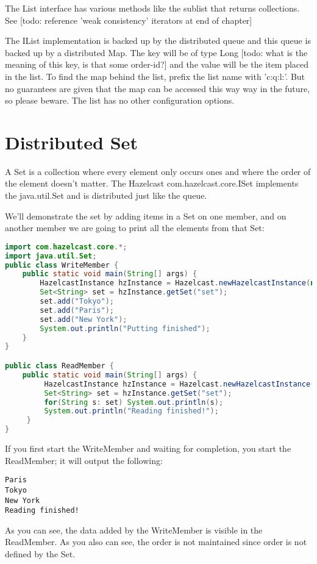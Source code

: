 The List interface has various methods like the sublist that returns collections. See [todo: reference 'weak consistency' iterators at end of chapter]

The IList implementation is backed up by the distributed queue and this queue is backed up by a distributed Map. The key will be of type Long [todo: what is the meaning of this key, is that some order-id?] and the value will be the item placed in the list. To find the map behind the list, prefix the list name with 'c:q:l:'. But no guarantees are given that the map can be accessed this way way in the future, so please beware. The list has no other configuration options.

\section{Distributed Set}
A Set is a collection where every element only occurs ones and where the order of the element doesn't matter. The Hazelcast com.hazelcast.core.ISet implements the java.util.Set and is distributed just like the queue.

We'll demonstrate the set by adding items in a Set on one member, and on another member we are going to print all the elements from that Set:
\begin{lstlisting}[language=java]
import com.hazelcast.core.*;
import java.util.Set;
public class WriteMember {
    public static void main(String[] args) {
        HazelcastInstance hzInstance = Hazelcast.newHazelcastInstance(null);
        Set<String> set = hzInstance.getSet("set");
        set.add("Tokyo");
        set.add("Paris");
        set.add("New York");
        System.out.println("Putting finished");
    }
}

public class ReadMember {
    public static void main(String[] args) {
         HazelcastInstance hzInstance = Hazelcast.newHazelcastInstance(null);
         Set<String> set = hzInstance.getSet("set");
         for(String s: set) System.out.println(s);
         System.out.println("Reading finished!");
     }
}
\end{lstlisting}
If you first start the WriteMember and waiting for completion, you start the ReadMember; it will output the following:
\begin{lstlisting}
Paris
Tokyo
New York
Reading finished!	
\end{lstlisting}
As you can see, the data added by the WriteMember is visible in the ReadMember. As you also can see, the order is not maintained since order is not defined by the Set.

